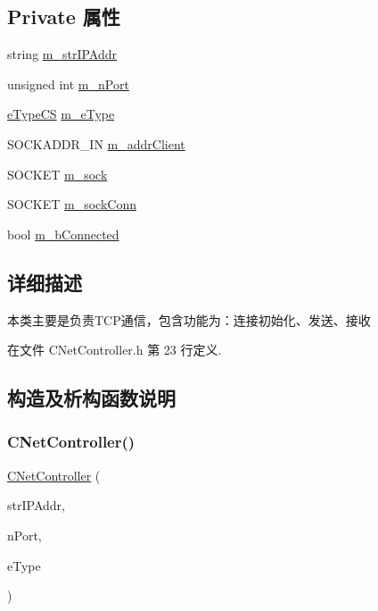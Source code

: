 \subsection*{Private 属性}
\begin{DoxyCompactItemize}
\item 
string \hyperlink{class_c_net_controller_a526584cace9de3af7249af094c380da3}{m\+\_\+str\+I\+P\+Addr}
\item 
unsigned int \hyperlink{class_c_net_controller_a00d4c1a5f4a0e9c3f9292e253f9d2617}{m\+\_\+n\+Port}
\item 
\hyperlink{_c_net_controller_8h_aa5667d9d3fb7d8d8f6293e70f99fd81d}{e\+Type\+CS} \hyperlink{class_c_net_controller_a9f4de383cd91d024dfe0e89430d4384d}{m\+\_\+e\+Type}
\item 
S\+O\+C\+K\+A\+D\+D\+R\+\_\+\+IN \hyperlink{class_c_net_controller_af29cf4fecb51308d282cdf6ef664144c}{m\+\_\+addr\+Client}
\item 
S\+O\+C\+K\+ET \hyperlink{class_c_net_controller_a99565a48431b9ecb2cd96e0107e87593}{m\+\_\+sock}
\item 
S\+O\+C\+K\+ET \hyperlink{class_c_net_controller_a7d49308d38eac082f57ad3b52ca12eef}{m\+\_\+sock\+Conn}
\item 
bool \hyperlink{class_c_net_controller_a815c57677b937b126963c6021e8b9ed2}{m\+\_\+b\+Connected}
\end{DoxyCompactItemize}


\subsection{详细描述}
本类主要是负责\+T\+C\+P通信，包含功能为：连接初始化、发送、接收 

在文件 C\+Net\+Controller.\+h 第 23 行定义.



\subsection{构造及析构函数说明}
\mbox{\label{class_c_net_controller_a3648c7b399e2e252b8bd04d23a3c3c03}} 
\subsubsection{\texorpdfstring{C\+Net\+Controller()}{CNetController()}}
{\footnotesize\ttfamily \hyperlink{class_c_net_controller}{C\+Net\+Controller} (\begin{DoxyParamCaption}\item[{string}]{str\+I\+P\+Addr,  }\item[{unsigned int}]{n\+Port,  }\item[{\hyperlink{_c_net_controller_8h_aa5667d9d3fb7d8d8f6293e70f99fd81d}{e\+Type\+CS}}]{e\+Type }\end{DoxyParamCaption})}



